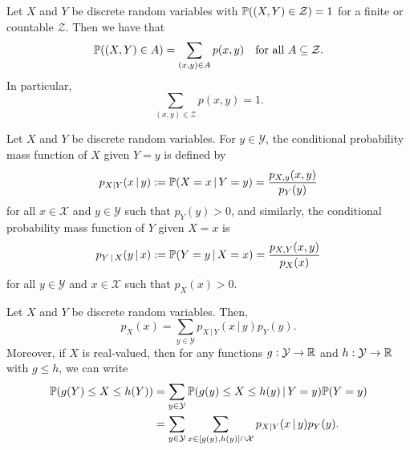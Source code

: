 \documentclass[10pt, a4paper]{article}
\begin{document}
\begin{theorem}\label{pre:prop:thm:discretevarcountsumeqone}
    Let $X$ and $Y$ be discrete random variables with $\P((X, Y) \in \mathcal{Z}) = 1$ for a finite or countable $\mathcal{Z}$.
    Then we have that
    \[
    \P((X, Y) \in A) = \sum_{(x, y) \in A}p(x, y)\quad\text{for all } A \subseteq \mathcal{Z}.
    \]
    In particular,
    \[
    \sum_{(x, y) \in \mathcal{Z}}p(x, y) = 1.
    \]
\end{theorem}

\begin{definition}
    Let $X$ and $Y$ be discrete random variables.
    For $y \in \mathcal{Y}$,
    the conditional probability mass function of $X$ given $Y = y$ is defined by
    \[
    p_{X | Y}(x\,|\,y) := \P(X = x\,|\, Y = y) = \frac{p_{X, y}(x, y)}{p_{Y}(y)}
    \]
    for all $x \in \mathcal{X}$ and $y \in \mathcal{Y}$ such that $p_Y(y) > 0$,
    and similarly,
    the conditional probability mass function of $Y$ given $X = x$ is
    \[
    p_{Y\,|\,X}(y\,|\,x) := \P(Y = y\,|\,X = x) = \frac{p_{X, Y}(x, y)}{p_X(x)}
    \]
    for all $y \in \mathcal{Y}$ and $x \in \mathcal{X}$ such that $p_X(x) > 0$.
\end{definition}

\begin{theorem}
    Let $X$ and $Y$ be discrete random variables.
    Then,
    \[
    p_X(x) = \sum_{y \in \mathcal{Y}}p_{X\,|\,Y}(x\,|\,y)p_Y(y).
    \]
    Moreover,
    if $X$ is real-valued,
    then for any functions $g : \mathcal{Y} \rightarrow \R$ and $h : \mathcal{Y} \rightarrow \R$ with $g \leq h$,
    we can write
    \begin{align*}
        \P(g(Y) \leq X \leq h(Y)) &= \sum_{y \in \mathcal{Y}}\P(g(y) \leq X \leq h(y)\,|\, Y = y)\P(Y = y) \\
        &= \sum_{y \in \mathcal{Y}}\sum_{x \in [g(y), h(y)] \cap \mathcal{X}}p_{X|Y}(x\,|\,y)p_Y(y).
    \end{align*}
\end{theorem}
\end{document}
